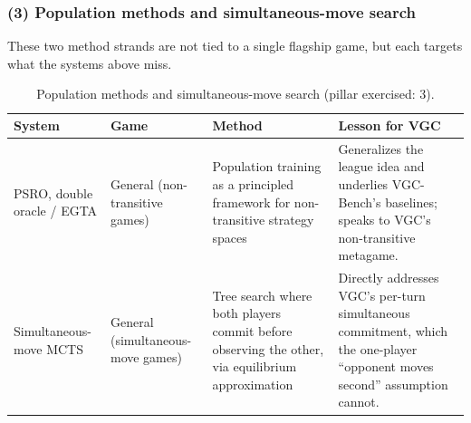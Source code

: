 \subsubsection{(3) Population methods and simultaneous-move search}
\label{subsubsec:analog_methods}

These two method strands are not tied to a single flagship game, but each targets
what the systems above miss.

\begin{table}[H]
\small
\tablespacing
\begin{tabularx}{\textwidth}{@{}>{\hsize=0.55\hsize\raggedright\arraybackslash}X
                                >{\hsize=0.55\hsize\raggedright\arraybackslash}X
                                >{\hsize=1.10\hsize\raggedright\arraybackslash}X
                                >{\hsize=1.80\hsize\raggedright\arraybackslash}X@{}}
\toprule
\textbf{System} & \textbf{Game} & \textbf{Method} & \textbf{Lesson for VGC} \\
\midrule
PSRO, double oracle / EGTA \cite{lanctot2017psro}
  & General (non-transitive games)
  & Population training as a principled framework for non-transitive strategy
    spaces
  & Generalizes the league idea and underlies VGC-Bench's baselines; speaks to
    VGC's non-transitive metagame. \\
\addlinespace
Simultaneous-move MCTS \cite{lanctot2014smmcts}
  & General (simultaneous-move games)
  & Tree search where both players commit before observing the other, via
    equilibrium approximation
  & Directly addresses VGC's per-turn simultaneous commitment, which the
    one-player ``opponent moves second'' assumption cannot. \\
\bottomrule
\end{tabularx}
\caption{Population methods and simultaneous-move search (pillar exercised: 3).}
\label{tab:analog_methods}
\end{table}

\clearpage

